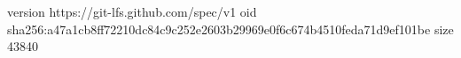 version https://git-lfs.github.com/spec/v1
oid sha256:a47a1cb8ff72210dc84c9c252e2603b29969e0f6c674b4510feda71d9ef101be
size 43840
